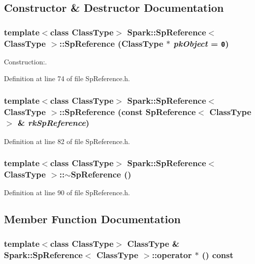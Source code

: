 \subsection{Constructor \& Destructor Documentation}
\subsubsection{\setlength{\rightskip}{0pt plus 5cm}template$<$class Class\-Type$>$ {\bf Spark::Sp\-Reference}$<$ Class\-Type $>$::{\bf Sp\-Reference} (Class\-Type $\ast$ {\em pk\-Object} = {\tt 0})}\label{classSpark_1_1SpReference_a0}


Construction:. 

Definition at line 74 of file Sp\-Reference.h.
\subsubsection{\setlength{\rightskip}{0pt plus 5cm}template$<$class Class\-Type$>$ {\bf Spark::Sp\-Reference}$<$ Class\-Type $>$::{\bf Sp\-Reference} (const {\bf Sp\-Reference}$<$ Class\-Type $>$ \& {\em rk\-Sp\-Reference})}\label{classSpark_1_1SpReference_a1}


Definition at line 82 of file Sp\-Reference.h.
\subsubsection{\setlength{\rightskip}{0pt plus 5cm}template$<$class Class\-Type$>$ {\bf Spark::Sp\-Reference}$<$ Class\-Type $>$::$\sim${\bf Sp\-Reference} ()}\label{classSpark_1_1SpReference_a2}


Definition at line 90 of file Sp\-Reference.h.

\subsection{Member Function Documentation}
\subsubsection{\setlength{\rightskip}{0pt plus 5cm}template$<$class Class\-Type$>$ Class\-Type \& {\bf Spark::Sp\-Reference}$<$ Class\-Type $>$::operator $\ast$ () const}\label{classSpark_1_1SpReference_a4}


